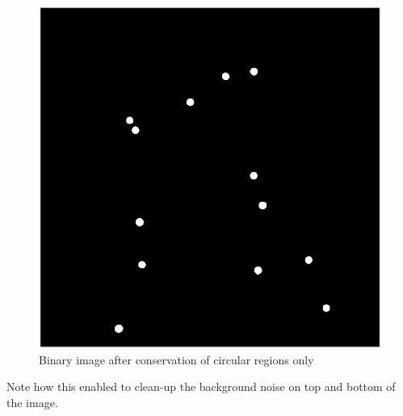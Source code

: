 \documentclass[a4paper]{article}
\begin{document}
\begin{enumerate}
    \begin{figure}[H]
        \center
        \label{fig5}
        \includegraphics[scale=0.75]{circMask.png}
        \caption{Binary image after conservation of circular regions only}
    \end{figure}

    Note how this enabled to clean-up the background noise on top and bottom of the image. 
    

\end{enumerate}
\end{document}
